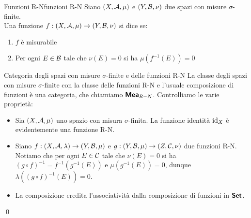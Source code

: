 \documentclass{article}
\begin{document}
\begin{definition}{Funzioni R-N}{funzioni R-N}
    Siano $(X,\mathcal{A},\mu)$ e $(Y,\mathcal{B},\nu)$ due spazi con misure $\sigma$-finite.\\
    Una funzione $f:(X,\mathcal{A},\mu)\to(Y,\mathcal{B},\nu)$ si dice  se:\begin{enumerate}
        \item $f$ è misurabile
        \item Per ogni $E \in \mathcal{B}$ tale che $\nu(E) = 0$ si ha $\mu(f^{-1}(E))=0$
    \end{enumerate}    
\end{definition}
\begin{remark}{Categoria degli spazi con misure $\sigma$-finite e delle funzioni R-N}{}
    La classe degli spazi con misure $\sigma$-finite con la classe delle funzioni R-N e l'usuale composizione di funzioni è una categoria, che chiamiamo $\text{\sffamily\textbf{Mea}}_{R-N}$.
    \proof
    Controlliamo le varie proprietà:
    \begin{itemize}
        \item Sia $(X,\mathcal{A},\mu)$ uno spazio con misura $\sigma$-finita. La funzione identità $\operatorname{id}_{X}$ è evidentemente una funzione R-N.
        \item Siano $f:(X,\mathcal{A},\lambda)\to (Y,\mathcal{B},\mu)$ e $g:(Y,\mathcal{B},\mu)\to(Z,\mathcal{C},\nu)$ due funzioni R-N. Notiamo che per ogni $E \in \mathcal{C}$ tale che $\nu(E) = 0$ si ha $(g\circ f)^{-1} = f^{-1}(g^{-1}(E))$ e $\mu(g^{-1}(E)) = 0$, dunque $\lambda((g\circ f)^{-1}(E))=0$.
        \item La composizione eredita l'associatività dalla composizione di funzioni in $\text{\sffamily\textbf{Set}}$.
        \end{itemize}
    \qed
\end{remark}

\end{document}
